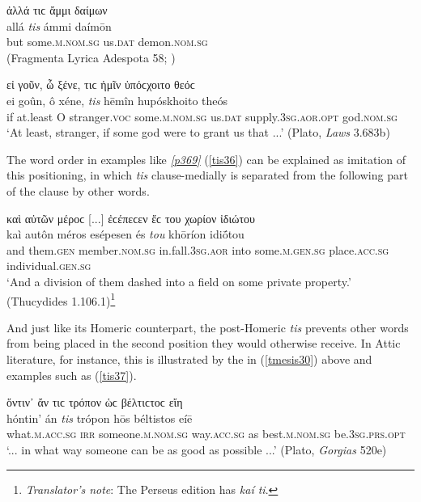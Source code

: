 \begin{exe}
\ex ἀλλά τιϲ ἄμμι δαίμων\\
\gll allá \emph{tis} ámmi daímōn\\
but some.\textsc{m.nom.sg} us.\textsc{dat} demon.\textsc{nom.sg}\\
\trans (Fragmenta Lyrica Adespota 58; \citealp[706]{Bergk1882})
\label{tis34}
\end{exe}

\begin{exe}
\ex εἰ γοῦν, ὦ ξένε, τιϲ ἡμῖν ὑπόϲχοιτο θεόϲ\\
\gll ei goûn, ô xéne, \emph{tis} hēmîn hupóskhoito theós\\
if at.least O stranger.\textsc{voc} some.\textsc{m.nom.sg} us.\textsc{dat} supply.\textsc{3sg.aor.opt} god.\textsc{nom.sg}\\
\trans `At least, stranger, if some god were to grant us that ...' (Plato, \textit{Laws} 3.683b)
\label{tis35}
\end{exe}

The word order in examples like \hyperlink{p369}{\emph{[p369]}} (\ref{tis36}) can be explained as imitation of this positioning, in which \textit{tis} clause-medially is separated from the following part of the clause by other words.

\begin{exe}
\ex καὶ αὐτῶν μέροϲ {[}...{]} ἐϲέπεϲεν ἔϲ του χωρίον ἰδιώτου\\
\gll kaì autôn méros esépesen és \emph{tou} khōríon idiṓtou\\
and them.\textsc{gen} member.\textsc{nom.sg} in.fall.\textsc{3sg.aor} into some.\textsc{m.gen.sg} place.\textsc{acc.sg} individual.\textsc{gen.sg}\\
\trans `And a division of them dashed into a field on some private property.' (Thucydides 1.106.1)\footnote{\emph{Translator's note}: The Perseus edition has \textit{kaí ti}.}
\label{tis36}
\end{exe}

And just like its Homeric counterpart, the post-Homeric \textit{tis}\label{tis} prevents other words from being placed in the second position they would otherwise receive. In Attic literature, for instance, this is illustrated by the  in (\ref{tmesis30}) above and examples such as (\ref{tis37}).

\begin{exe}
\ex ὅντιν᾽ ἄν τιϲ τρόπον ὡϲ βέλτιϲτοϲ εἴη\\
\gll hóntin' án \emph{tis} trópon hōs béltistos eíē\\
what.\textsc{m.acc.sg} \textsc{irr} someone.\textsc{m.nom.sg} way.\textsc{acc.sg} as best.\textsc{m.nom.sg} be.\textsc{3sg.prs.opt}\\
\trans `... in what way someone can be as good as possible ...' (Plato, \textit{Gorgias} 520e)
\label{tis37}
\end{exe}

